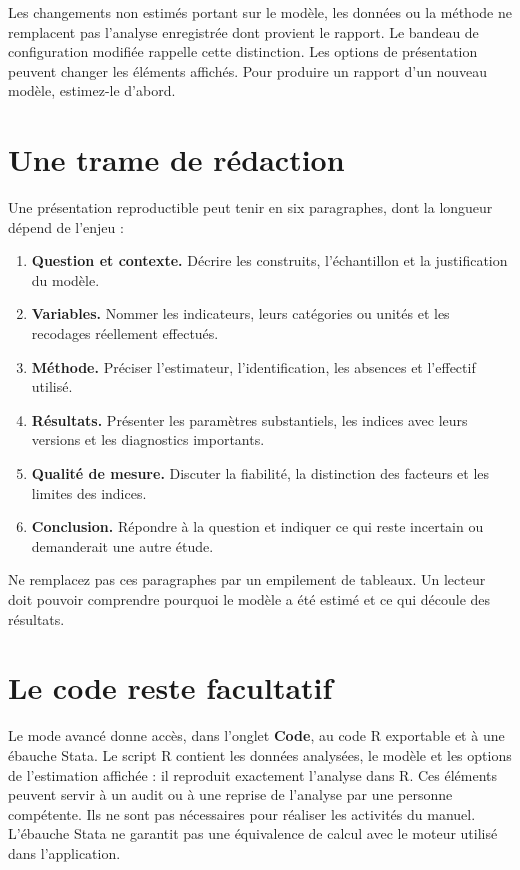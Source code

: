 \documentclass[
  french,
  11pt,
  a4paper,
  DIV=11,
  numbers=noendperiod]{scrreprt}
\providecommand{\tightlist}{%
  \setlength{\itemsep}{0pt}\setlength{\parskip}{0pt}}
\begin{document}
Les changements non estimés portant sur le modèle, les données ou la
méthode ne remplacent pas l'analyse enregistrée dont provient le
rapport. Le bandeau de configuration modifiée rappelle cette
distinction. Les options de présentation peuvent changer les éléments
affichés. Pour produire un rapport d'un nouveau modèle, estimez-le
d'abord.

\section{Une trame de rédaction}\label{une-trame-de-ruxe9daction}

Une présentation reproductible peut tenir en six paragraphes, dont la
longueur dépend de l'enjeu :

\begin{enumerate}
\def\labelenumi{\arabic{enumi}.}
\tightlist
\item
  \textbf{Question et contexte.} Décrire les construits, l'échantillon
  et la justification du modèle.
\item
  \textbf{Variables.} Nommer les indicateurs, leurs catégories ou unités
  et les recodages réellement effectués.
\item
  \textbf{Méthode.} Préciser l'estimateur, l'identification, les
  absences et l'effectif utilisé.
\item
  \textbf{Résultats.} Présenter les paramètres substantiels, les indices
  avec leurs versions et les diagnostics importants.
\item
  \textbf{Qualité de mesure.} Discuter la fiabilité, la distinction des
  facteurs et les limites des indices.
\item
  \textbf{Conclusion.} Répondre à la question et indiquer ce qui reste
  incertain ou demanderait une autre étude.
\end{enumerate}

Ne remplacez pas ces paragraphes par un empilement de tableaux. Un
lecteur doit pouvoir comprendre pourquoi le modèle a été estimé et ce
qui découle des résultats.

\section{Le code reste facultatif}\label{le-code-reste-facultatif}

Le mode avancé donne accès, dans l'onglet \textbf{Code}, au code R
exportable et à une ébauche Stata. Le script R contient les données
analysées, le modèle et les options de l'estimation affichée : il
reproduit exactement l'analyse dans R. Ces éléments peuvent servir à un
audit ou à une reprise de l'analyse par une personne compétente. Ils ne
sont pas nécessaires pour réaliser les activités du manuel. L'ébauche
Stata ne garantit pas une équivalence de calcul avec le moteur utilisé
dans l'application.
\end{document}

